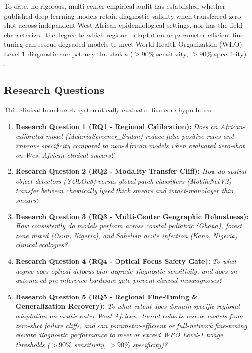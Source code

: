 \documentclass[a4paper,11pt]{article}
\begin{document}
To date, no rigorous, multi-center empirical audit has established whether published deep learning models retain diagnostic validity when transferred zero-shot across independent West African epidemiological settings, nor has the field characterized the degree to which regional adaptation or parameter-efficient fine-tuning can rescue degraded models to meet World Health Organization (WHO) Level-1 diagnostic competency thresholds ($\ge 90\%$ sensitivity, $\ge 90\%$ specificity) \citep{who2016}.

\subsection{Research Questions}
This clinical benchmark systematically evaluates five core hypotheses:
\begin{enumerate}
    \item \textbf{Research Question 1 (RQ1 - Regional Calibration):} \textit{Does an African-calibrated model (MalariaScreener\_Sudan) reduce false-positive rates and improve specificity compared to non-African models when evaluated zero-shot on West African clinical smears?}
    \item \textbf{Research Question 2 (RQ2 - Modality Transfer Cliff):} \textit{How do spatial object detectors (YOLOv8) versus global patch classifiers (MobileNetV2) transfer between chemically lysed thick smears and intact-monolayer thin smears?}
    \item \textbf{Research Question 3 (RQ3 - Multi-Center Geographic Robustness):} \textit{How consistently do models perform across coastal pediatric (Ghana), forest zone mixed (Osun, Nigeria), and Sahelian acute infection (Kano, Nigeria) clinical ecologies?}
    \item \textbf{Research Question 4 (RQ4 - Optical Focus Safety Gate):} \textit{To what degree does optical defocus blur degrade diagnostic sensitivity, and does an automated pre-inference hardware gate prevent clinical misdiagnoses?}
    \item \textbf{Research Question 5 (RQ5 - Regional Fine-Tuning \& Generalization Recovery):} \textit{To what extent does domain-specific regional adaptation on multi-center West African clinical cohorts rescue models from zero-shot failure cliffs, and can parameter-efficient or full-network fine-tuning elevate diagnostic performance to meet or exceed WHO Level-1 triage thresholds ($>90\%$ sensitivity, $>90\%$ specificity)?}
\end{enumerate}
\end{document}
